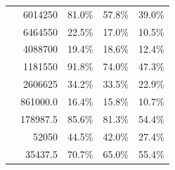 \begin{table}[!tbp]
\begin{tabular}{lrrrr}
\eeTo{ \Pquark \Pquark} &  6014250 & 81.0\%& 57.8\%& 39.0\%\\
\eeTo{ \Pquark \Pquark \Plepton \Pnu} &  6464550 & 22.5\%& 17.0\%& 10.5\%\\
\eeTo{ \Pquark \Pquark \Pl \Pl} &  4088700 & 19.4\%& 18.6\%& 12.4\%\\
\eeTo{ \Pquark \Pquark \Pnu \Pnu} & 1181550 & 91.8\%& 74.0\%& 47.3\% \\
\hline
\egamma{\Pepm}{\Pphoton}{\BS}{\Pepm \Pquark \Pquark \Pquark \Pquark} & 2606625  & 34.2\%& 33.5\%& 22.9\%\\
\egamma{\Pepm}{\Pphoton}{\EPA}{\Pepm \Pquark \Pquark \Pquark \Pquark} & 861000.0 & 16.4\%& 15.8\%& 10.7\%\\
\egamma{\Pepm}{\Pphoton}{\BS}{\Pnu \Pquark \Pquark \Pquark \Pquark}& 178987.5  & 85.6\%& 81.3\%& 54.4\%\\
\egamma{\Pepm}{\Pphoton}{\EPA}{\Pnu \Pquark \Pquark \Pquark \Pquark}& 52050  & 44.5\% & 42.0\%& 27.4\%\\
\egamma{\Pepm}{\Pphoton}{\BS}{\Pquark \Pquark \PHiggs \Pnu} & 35437.5  & 70.7\% & 65.0\%& 55.4\%\\

\end{tabular}
\end{table}
